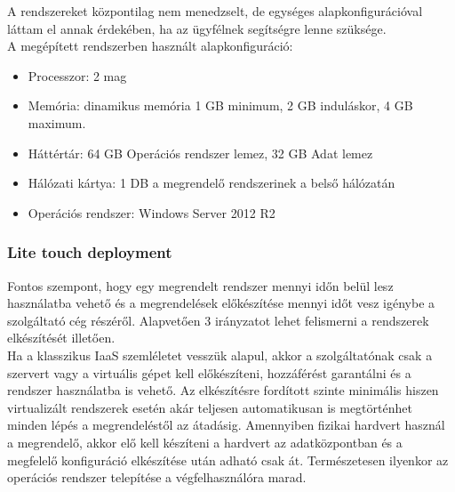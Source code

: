\documentclass[12pt,oneside,justify,table]{book}
\begin{document}
A rendszereket központilag nem menedzselt, de egységes alapkonfigurációval láttam el annak érdekében, ha az ügyfélnek segítségre lenne szüksége. \\

\noindent A megépített rendszerben használt alapkonfiguráció:
\begin{itemize}
	\item Processzor: 2 mag
	\item Memória: dinamikus memória 1 GB minimum, 2 GB induláskor, 4 GB maximum.
	\item Háttértár: 64 GB Operációs rendszer lemez, 32 GB Adat lemez
	\item Hálózati kártya: 1 DB a megrendelő rendszerinek a belső hálózatán
	\item Operációs rendszer: Windows Server 2012 R2
\end{itemize}

\subsubsection{Lite touch deployment}
Fontos szempont, hogy egy megrendelt rendszer mennyi időn belül lesz használatba vehető és a megrendelések előkészítése mennyi időt vesz igénybe a szolgáltató cég részéről. Alapvetően 3 irányzatot lehet felismerni a rendszerek elkészítését illetően.\\

Ha a klasszikus IaaS szemléletet vesszük alapul, akkor a szolgáltatónak csak a szervert vagy a virtuális gépet kell előkészíteni, hozzáférést garantálni és a rendszer használatba is vehető. Az elkészítésre fordított szinte minimális hiszen virtualizált rendszerek esetén akár teljesen automatikusan is megtörténhet minden lépés a megrendeléstől az átadásig. Amennyiben fizikai hardvert használ a megrendelő, akkor elő kell készíteni a hardvert az adatközpontban és a megfelelő konfiguráció elkészítése után adható csak át. Természetesen ilyenkor az operációs rendszer telepítése a végfelhasználóra marad. \\
\end{document}
